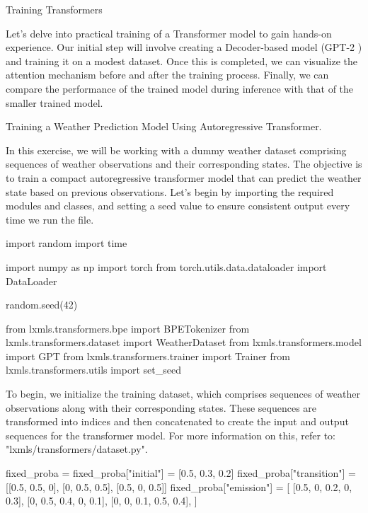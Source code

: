 \begin{exercise} Training Transformers

Let's delve into practical training of a Transformer model to gain hands-on experience. Our initial step will involve creating a Decoder-based model (GPT-2 \cite{gpt-2}) and training it on a modest dataset. Once this is completed, we can visualize the attention mechanism before and after the training process. Finally, we can compare the performance of the trained model during inference with that of the smaller trained model.

\begin{exercise} Training a Weather Prediction Model Using Autoregressive Transformer.

In this exercise, we will be working with a dummy weather dataset comprising sequences of weather observations and their corresponding states. The objective is to train a compact autoregressive transformer model that can predict the weather state based on previous observations.
Let's begin by importing the required modules and classes, and setting a seed value to ensure consistent output every time we run the file.

\begin{python}
import random
import time

import numpy as np
import torch
from torch.utils.data.dataloader import DataLoader

random.seed(42)

from lxmls.transformers.bpe import BPETokenizer
from lxmls.transformers.dataset import WeatherDataset
from lxmls.transformers.model import GPT
from lxmls.transformers.trainer import Trainer
from lxmls.transformers.utils import set_seed
\end{python}

\end{exercise}

To begin, we initialize the training dataset, which comprises sequences of weather observations along with their corresponding states. These sequences are transformed into indices and then concatenated to create the input and output sequences for the transformer model. For more information on this, refer to: "lxmls/transformers/dataset.py".

\begin{python}
fixed_proba = {}
fixed_proba["initial"] = [0.5, 0.3, 0.2]
fixed_proba["transition"] = [[0.5, 0.5, 0], [0, 0.5, 0.5], [0.5, 0, 0.5]]
fixed_proba["emission"] = [
    [0.5, 0, 0.2, 0, 0.3],
    [0, 0.5, 0.4, 0, 0.1],
    [0, 0, 0.1, 0.5, 0.4],
]


\end{python}
\end{exercise}
